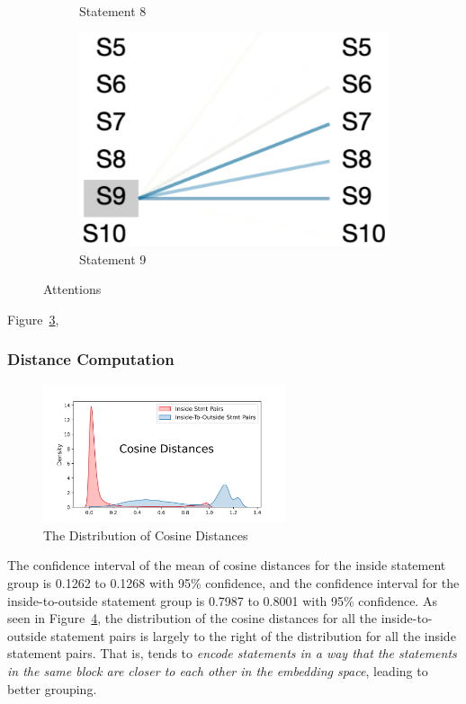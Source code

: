 \begin{figure}
\begin{subfigure}[b]{0.15\textwidth}
         \caption{Statement 8}
         \label{fig:stmt-8}
     \end{subfigure}
     \hfill
     \begin{subfigure}[b]{0.15\textwidth}
         \centering
         \includegraphics[width=\textwidth]{sec9-fig3.png}
         \caption{Statement 9}
         \label{fig:stmt-9}
     \end{subfigure}
        \caption{Attentions}
        \label{fig:rq4-attention}
\end{figure}

Figure~\ref{fig:rq4-attention},

\subsubsection{Distance Computation}


\begin{figure}[t]
 	\centering
 	\includegraphics[width=2.8in]{rq4-density-v2.png}
        \vspace{-12pt}
 	\caption{The Distribution of Cosine Distances}
 	\label{fig:rq4-density}	
\end{figure}

The confidence interval of the mean of cosine distances for the inside
statement group is 0.1262 to 0.1268 with 95\% confidence, and the
confidence interval for the inside-to-outside statement group is
0.7987 to 0.8001 with 95\% confidence. As seen in
Figure~\ref{fig:rq4-density}, the distribution of the cosine distances
for all the inside-to-outside statement pairs is largely to the right
of the distribution for all the inside statement pairs. That is,
{\tool} tends to {\em encode statements in a way that the statements
  in the same  block are closer to each other in the
  embedding space}, leading to better grouping.


